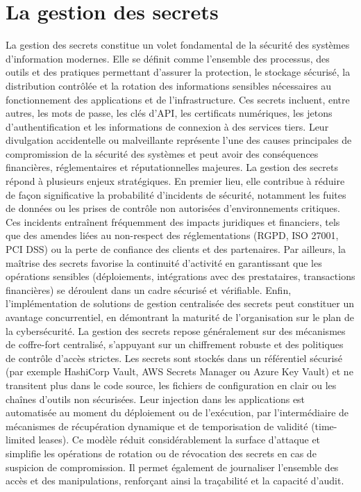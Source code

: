 \section{La gestion des secrets}

La gestion des secrets constitue un volet fondamental de la sécurité des systèmes d’information modernes. Elle se définit comme l’ensemble des processus, des outils et des pratiques permettant d’assurer la protection, le stockage sécurisé, la distribution contrôlée et la rotation des informations sensibles nécessaires au fonctionnement des applications et de l’infrastructure. Ces secrets incluent, entre autres, les mots de passe, les clés d’API, les certificats numériques, les jetons d’authentification et les informations de connexion à des services tiers. Leur divulgation accidentelle ou malveillante représente l’une des causes principales de compromission de la sécurité des systèmes et peut avoir des conséquences financières, réglementaires et réputationnelles majeures.
La gestion des secrets répond à plusieurs enjeux stratégiques. En premier lieu, elle contribue à réduire de façon significative la probabilité d’incidents de sécurité, notamment les fuites de données ou les prises de contrôle non autorisées d’environnements critiques. Ces incidents entraînent fréquemment des impacts juridiques et financiers, tels que des amendes liées au non-respect des réglementations (RGPD, ISO 27001, PCI DSS) ou la perte de confiance des clients et des partenaires. Par ailleurs, la maîtrise des secrets favorise la continuité d’activité en garantissant que les opérations sensibles (déploiements, intégrations avec des prestataires, transactions financières) se déroulent dans un cadre sécurisé et vérifiable. Enfin, l’implémentation de solutions de gestion centralisée des secrets peut constituer un avantage concurrentiel, en démontrant la maturité de l’organisation sur le plan de la cybersécurité.
La gestion des secrets repose généralement sur des mécanismes de coffre-fort centralisé, s’appuyant sur un chiffrement robuste et des politiques de contrôle d’accès strictes. Les secrets sont stockés dans un référentiel sécurisé (par exemple HashiCorp Vault, AWS Secrets Manager ou Azure Key Vault) et ne transitent plus dans le code source, les fichiers de configuration en clair ou les chaînes d’outils non sécurisées. Leur injection dans les applications est automatisée au moment du déploiement ou de l’exécution, par l’intermédiaire de mécanismes de récupération dynamique et de temporisation de validité (time-limited leases). Ce modèle réduit considérablement la surface d’attaque et simplifie les opérations de rotation ou de révocation des secrets en cas de suspicion de compromission. Il permet également de journaliser l’ensemble des accès et des manipulations, renforçant ainsi la traçabilité et la capacité d’audit.

